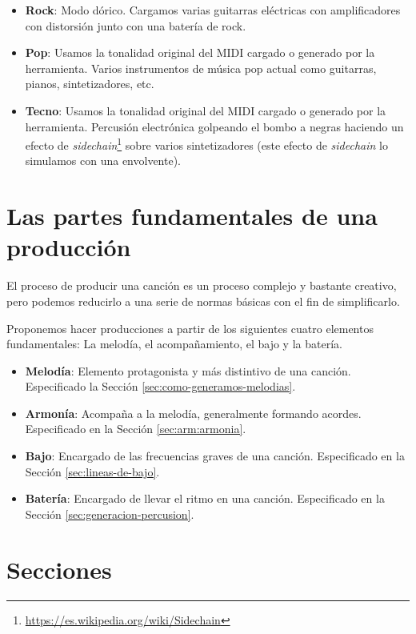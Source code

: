 \begin{itemize}
    \item \textbf{Rock}: Modo dórico. Cargamos varias guitarras eléctricas con amplificadores con distorsión junto con una batería de rock.
    \item \textbf{Pop}: Usamos la tonalidad original del MIDI cargado o generado por la herramienta. Varios instrumentos de música pop actual como guitarras, pianos, sintetizadores, etc.
    \item \textbf{Tecno}: Usamos la tonalidad original del MIDI cargado o generado por la herramienta. Percusión electrónica golpeando el bombo a negras haciendo un efecto de \textit{sidechain}\footnote{\url{https://es.wikipedia.org/wiki/Sidechain}} sobre varios sintetizadores (este efecto de \textit{sidechain} lo simulamos con una envolvente).
\end{itemize}


\section{Las partes fundamentales de una producción}
\label{sec:fundamentos-producccion-musical}
El proceso de producir una canción es un proceso complejo y bastante creativo, pero podemos reducirlo a una serie de normas básicas con el fin de simplificarlo.

Proponemos hacer producciones a partir de los siguientes cuatro elementos fundamentales: La melodía, el acompañamiento, el bajo y la batería.

\begin{itemize}
    \item \textbf{Melodía}: Elemento protagonista y más distintivo de una canción. Especificado la Sección \ref{sec:como-generamos-melodias}.
    \item \textbf{Armonía}: Acompaña a la melodía, generalmente formando acordes. Especificado en la Sección \ref{sec:arm:armonia}.
    \item \textbf{Bajo}: Encargado de las frecuencias graves de una canción. Especificado en la Sección \ref{sec:lineas-de-bajo}.
    \item \textbf{Batería}: Encargado de llevar el ritmo en una canción. Especificado en la Sección \ref{sec:generacion-percusion}.
\end{itemize}


\section{Secciones}
\label{sec:secciones}

